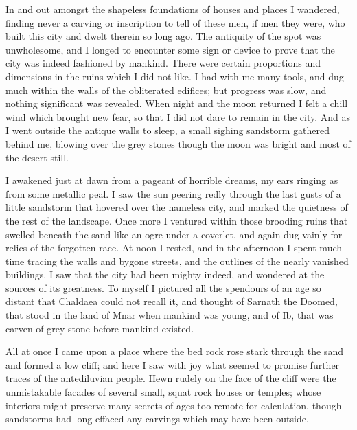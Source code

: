 ﻿\documentclass{article}
\begin{document}
In and out amongst the shapeless foundations of houses and places I wandered,
finding never a carving or inscription to tell of these men, if men they were,
who built this city and dwelt therein so long ago. The antiquity of the spot
was unwholesome, and I longed to encounter some sign or device to prove that
the city was indeed fashioned by mankind. There were certain proportions and
dimensions in the ruins which I did not like. I had with me many tools, and dug
much within the walls of the obliterated edifices; but progress was slow, and
nothing significant was revealed. When night and the moon returned I felt a
chill wind which brought new fear, so that I did not dare to remain in the
city. And as I went outside the antique walls to sleep, a small sighing
sandstorm gathered behind me, blowing over the grey stones though the moon was
bright and most of the desert still.

I awakened just at dawn from a pageant of horrible dreams, my ears ringing as
from some metallic peal. I saw the sun peering redly through the last gusts of
a little sandstorm that hovered over the nameless city, and marked the
quietness of the rest of the landscape. Once more I ventured within those
brooding ruins that swelled beneath the sand like an ogre under a coverlet, and
again dug vainly for relics of the forgotten race. At noon I rested, and in the
afternoon I spent much time tracing the walls and bygone streets, and the
outlines of the nearly vanished buildings. I saw that the city had been mighty
indeed, and wondered at the sources of its greatness. To myself I pictured all
the spendours of an age so distant that Chaldaea could not recall it, and
thought of Sarnath the Doomed, that stood in the land of Mnar when mankind was
young, and of Ib, that was carven of grey stone before mankind existed.

All at once I came upon a place where the bed rock rose stark through the sand
and formed a low cliff; and here I saw with joy what seemed to promise further
traces of the antediluvian people. Hewn rudely on the face of the cliff were
the unmistakable facades of several small, squat rock houses or temples; whose
interiors might preserve many secrets of ages too remote for calculation,
though sandstorms had long effaced any carvings which may have been outside.
\end{document}
